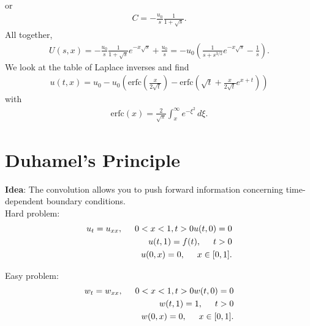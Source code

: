 \documentclass{book}
\theoremstyle{definition}
\newcommand{\f}[2]{\frac{#1}{#2}}
\newcommand{\lp}{\left(}
\newcommand{\rp}{\right)}
\begin{document}
or
\begin{align*}
C = -\f{u_0}{s}\f{1}{1 + \sqrt{s}}.
\end{align*}
All together,
\begin{align*}
U(s,x) = -\f{u_0}{s}\f{1}{1 + \sqrt{s}}e^{-x\sqrt{s}} + \f{u_0}{s} = -u_0 \lp \f{1}{s + s^{3/2}}e^{-x\sqrt{s}} - \f{1}{s} \rp.
\end{align*}
We look at the table of Laplace inverses and find
\begin{align*}
u(t,x) = u_0 - u_0 \lp \text{erfc}\lp\f{x}{2\sqrt{t}}\rp - \text{erfc}\lp \sqrt{t} + \f{x}{2\sqrt{t}}e^{x+t} \rp \rp
\end{align*}
with
\begin{align*}
\text{erfc}(x) = \f{2}{\sqrt{\pi}}\int^\infty_x e^{-\xi^2}\,d\xi.
\end{align*}























\newpage

\chapter{Duhamel's Principle}


\textbf{Idea}: The convolution allows you to push forward information concerning time-dependent boundary conditions. \\

Hard problem:
\begin{align*}
u_t = u_{xx}, \hspace{0.5cm} 0 < x < 1, t>0
u(t,0) = 0\\
u(t,1) = f(t),\hspace{0.5cm} t>0\\
u(0,x) = 0, \hspace{0.5cm} x\in [0,1].
\end{align*}


Easy problem:
\begin{align*}
w_t = w_{xx}, \hspace{0.5cm} 0 < x < 1, t>0
w(t,0) = 0\\
w(t,1) = 1,\hspace{0.5cm} t >0\\
w(0,x) = 0, \hspace{0.5cm} x\in [0,1].
\end{align*}
\end{document}
